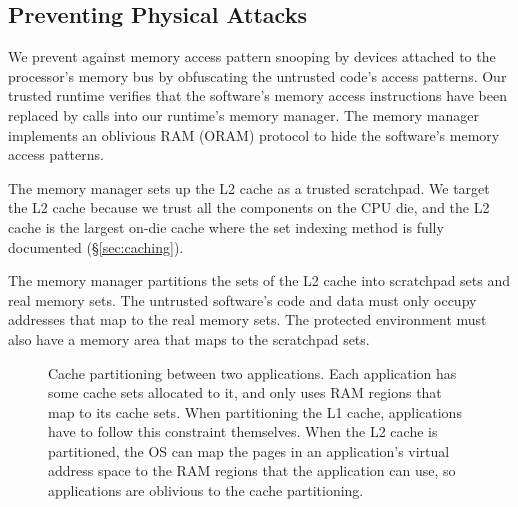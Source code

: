 \subsection{Preventing Physical Attacks}

We prevent against memory access pattern snooping by devices attached to the
processor's memory bus by obfuscating the untrusted code's access patterns. Our
trusted runtime verifies that the software's memory access instructions have
been replaced by calls into our runtime's memory manager. The memory manager
implements an oblivious RAM (ORAM) protocol \cite{stefanov2013path} to hide the
software's memory access patterns.

The memory manager sets up the L2 cache as a trusted scratchpad. We target the
L2 cache because we trust all the components on the CPU die, and the L2 cache
is the largest on-die cache where the set indexing method is fully documented
(\S \ref{sec:caching}).

The memory manager partitions the sets of the L2 cache into scratchpad sets and
real memory sets. The untrusted software's code and data must only occupy
addresses that map to the real memory sets. The protected environment must also
have a memory area that maps to the scratchpad sets.

\begin{figure}[hbtp]
  \caption{
    Cache partitioning between two applications. Each application has some
    cache sets allocated to it, and only uses RAM regions that map to its cache
    sets. When partitioning the L1 cache, applications have to follow this
    constraint themselves. When the L2 cache is partitioned, the OS can map the
    pages in an application's virtual address space to the RAM regions that the
    application can use, so applications are oblivious to the cache
    partitioning.
  }
  \label{fig:cache_partitions}
\end{figure}

